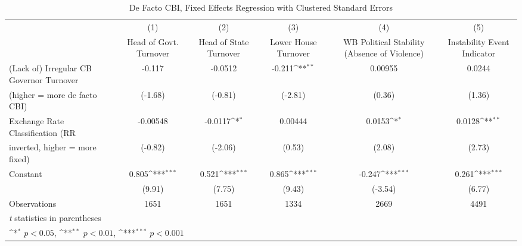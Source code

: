 \begin{table}[htbp]\centering
\def\sym#1{\ifmmode^{#1}\else\(^{#1}\)\fi}
\caption{De Facto CBI, Fixed Effects Regression with Clustered Standard Errors \label{multIndFEDF}}
\begin{tabular}{l*{5}{c}}
\toprule
                                        &\multicolumn{1}{c}{(1)}&\multicolumn{1}{c}{(2)}&\multicolumn{1}{c}{(3)}&\multicolumn{1}{c}{(4)}&\multicolumn{1}{c}{(5)}\\
                                        &\multicolumn{1}{c}{Head of Govt. Turnover}&\multicolumn{1}{c}{Head of State Turnover}&\multicolumn{1}{c}{Lower House Turnover}&\multicolumn{1}{c}{WB Political Stability (Absence of Violence)}&\multicolumn{1}{c}{Instability Event Indicator}\\
\midrule
(Lack of) Irregular CB Governor Turnover&    -0.117         &   -0.0512         &    -0.211\sym{**} &   0.00955         &    0.0244         \\
(higher = more de facto CBI)            &   (-1.68)         &   (-0.81)         &   (-2.81)         &    (0.36)         &    (1.36)         \\
\addlinespace
Exchange Rate Classification (RR        &  -0.00548         &   -0.0117\sym{*}  &   0.00444         &    0.0153\sym{*}  &    0.0128\sym{**} \\
inverted, higher = more fixed)          &   (-0.82)         &   (-2.06)         &    (0.53)         &    (2.08)         &    (2.73)         \\
\addlinespace
Constant                                &     0.805\sym{***}&     0.521\sym{***}&     0.865\sym{***}&    -0.247\sym{***}&     0.261\sym{***}\\
                                        &    (9.91)         &    (7.75)         &    (9.43)         &   (-3.54)         &    (6.77)         \\
\midrule
Observations                            &      1651         &      1651         &      1334         &      2669         &      4491         \\
\bottomrule
\multicolumn{6}{l}{\footnotesize \textit{t} statistics in parentheses}\\
\multicolumn{6}{l}{\footnotesize \sym{*} \(p<0.05\), \sym{**} \(p<0.01\), \sym{***} \(p<0.001\)}\\
\end{tabular}
\end{table}
